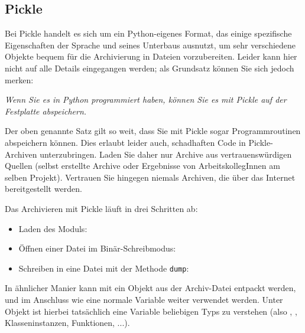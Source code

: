 \subsection{Pickle}
Bei Pickle handelt es sich um ein Python-eigenes Format, das einige spezifische Eigenschaften der Sprache und seines Unterbaus ausnutzt, um sehr verschiedene Objekte bequem für die Archivierung in Dateien vorzubereiten. Leider kann hier nicht auf alle Details eingegangen werden; als Grundsatz können Sie sich jedoch merken:
\begin{center}
	\emph{Wenn Sie es in Python programmiert haben, können Sie es mit Pickle auf der Festplatte abspeichern.}
\end{center}

\begin{warnbox}
Der oben genannte Satz gilt so weit, dass Sie mit Pickle sogar Programmroutinen abspeichern können. Dies erlaubt leider auch, schadhaften Code in Pickle-Archiven unterzubringen. Laden Sie daher nur Archive aus vertrauenswürdigen Quellen (\eg selbst erstellte Archive oder Ergebnisse von ArbeitskollegInnen am selben Projekt). Vertrauen Sie hingegen niemals Archiven, die über das Internet bereitgestellt werden.
\end{warnbox}

Das Archivieren mit Pickle läuft in drei Schritten ab: 
\begin{itemize}
\item Laden des Moduls: 
\item Öffnen einer Datei im Binär-Schreibmodus: 
\item Schreiben in eine Datei mit der Methode \texttt{dump}: 
\end{itemize}

In ähnlicher Manier kann mit  ein Objekt aus der Archiv-Datei entpackt werden, und im Anschluss wie eine normale Variable weiter verwendet werden. Unter Objekt ist hierbei tatsächlich eine Variable beliebigen Typs zu verstehen (also \eg {}, , Klasseninstanzen, Funktionen, ...).

